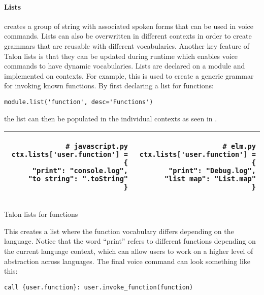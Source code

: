 \documentclass[../thesis.tex]{subfiles}
\begin{document}
\paragraph{Lists}
creates a group of string with associated spoken forms that can be used in voice commands.
Lists can also be overwritten in different contexts in order to create grammars that are reusable
with different vocabularies.
Another key feature of Talon lists is that they can be updated during runtime which enables voice commands to have dynamic vocabularies.
Lists are declared on a module and implemented on contexts.
For example, this is used to create a generic grammar for invoking known functions.
By first declaring a list for functions:
\begin{verbatim}
module.list('function', desc='Functions')
\end{verbatim}
the list can then be populated in the individual contexts as seen in .
\begin{listing}[ht]
\begin{tabular}{|r|r|}
\hline
\begin{minipage}[t]{0.49\textwidth}
\begin{verbatim}
# javascript.py
ctx.lists['user.function'] = {
    "print": "console.log",
    "to string": ".toString"
}
\end{verbatim}
\end{minipage}
& 
\begin{minipage}[t]{0.49\textwidth}
\begin{verbatim}
# elm.py
ctx.lists['user.function'] = {
    "print": "Debug.log",
    "list map": "List.map"
}
\end{verbatim}
\end{minipage}\\
\hline
\end{tabular}
\caption{Talon lists for functions}
\label{listing:lists}
\end{listing}

This creates a list where the function vocabulary differs depending on the language.
Notice that the word ``print'' refers to different functions depending on the current language context,
which can allow users to work on a higher level of abstraction across languages.
The final voice command can look something like this:
\begin{verbatim}
call {user.function}: user.invoke_function(function) 
\end{verbatim}
\end{document}
